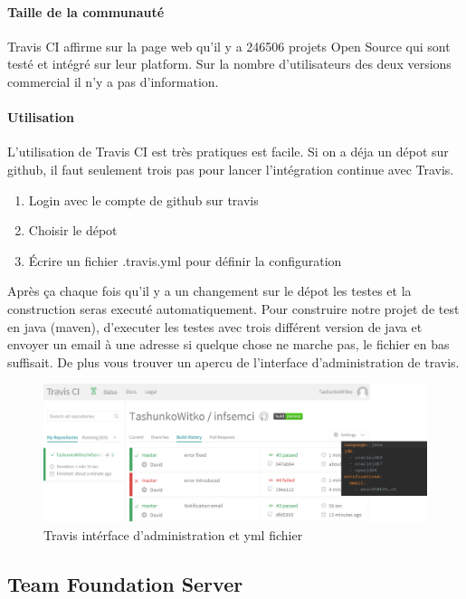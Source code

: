 \paragraph{Taille de la communauté}
Travis CI affirme sur la page web qu'il y a 246506 projets Open Source qui sont testé et intégré sur leur platform. Sur la nombre d'utilisateurs des deux versions commercial il n'y a pas d'information.

\paragraph{Utilisation}
L'utilisation de Travis CI est très pratiques est facile. Si on a déja un dépot sur github, il faut seulement trois pas pour lancer l'intégration continue avec Travis.

\begin{enumerate}
	\item Login avec le compte de github sur travis
	\item Choisir le dépot
	\item Écrire un fichier .travis.yml pour définir la configuration
\end{enumerate}

Après ça chaque fois qu'il y a un changement sur le dépot les testes et la construction seras executé automatiquement. Pour construire notre projet de test en java (maven), d'executer les testes avec trois différent version de java et envoyer un email à une adresse si quelque chose ne marche pas, le fichier en bas suffisait. De plus vous trouver un apercu de l'interface d'administration de travis.

\begin{figure}[H]
	\centering
		\includegraphics[scale=0.2]{bilder/travisciymlfile}
	\caption{Travis intérface d'administration et yml fichier}
	\label{fig:travisgui}
\end{figure}

\subsection{Team Foundation Server}



